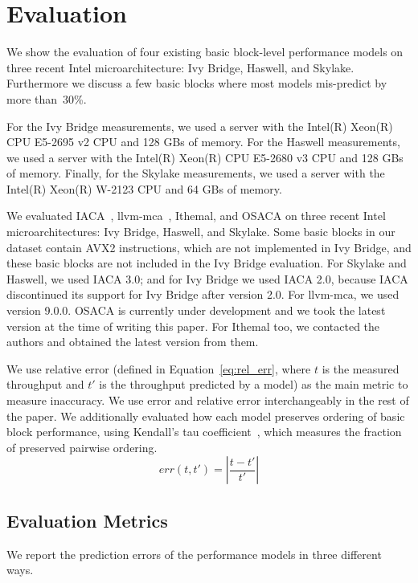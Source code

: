 \section{Evaluation}
We show the evaluation of four existing basic block-level
performance models on three recent Intel microarchitecture:
Ivy Bridge, Haswell, and Skylake. Furthermore we discuss a few basic blocks where most models
mis-predict by more than~30\%.

For the Ivy Bridge measurements,
we used a server with the Intel(R) Xeon(R) CPU E5-2695 v2 CPU and 128 GBs of memory. 
For the Haswell measurements,
we used a server with the Intel(R) Xeon(R) CPU E5-2680 v3 CPU and 128 GBs of memory. 
Finally, for the Skylake measurements, we used a server with the Intel(R) Xeon(R) W-2123 CPU and 64 GBs of memory. 

We evaluated IACA~\cite{iaca}, llvm-mca~\cite{llvm-mca}, Ithemal\cite{ithemal}, and OSACA\cite{osaca}
on three recent Intel microarchitectures: Ivy Bridge, Haswell, and Skylake.
Some basic blocks in our dataset contain AVX2 instructions,
which are not implemented in Ivy Bridge,
and these basic blocks are not included in the Ivy Bridge evaluation.
For Skylake and Haswell, we used IACA 3.0;
and for Ivy Bridge we used IACA 2.0, because IACA discontinued its support for
Ivy Bridge after version 2.0.
For llvm-mca, we used version 9.0.0.
OSACA is currently under development and we took the latest version
at the time of writing this paper.
For Ithemal too, we contacted the authors and obtained the latest version from them.

We use relative error (defined in Equation~\ref{eq:rel_err}, where $t$ is the measured throughput and $t'$ is the throughput predicted by a model)
as the main metric to measure inaccuracy.
We use error and relative error interchangeably in the rest of the paper.
We additionally evaluated how each model preserves ordering of basic block performance,
using Kendall's tau coefficient~\cite{kendalltau},
which measures the fraction of preserved pairwise ordering.
\begin{equation}
\mathit{err}(t, t') = \left| \frac{t - t'}{t'} \right| 
\label{eq:rel_err}
\end{equation}

\subsection{Evaluation Metrics}\label{results}
We report the prediction errors of the performance models in three different ways.

